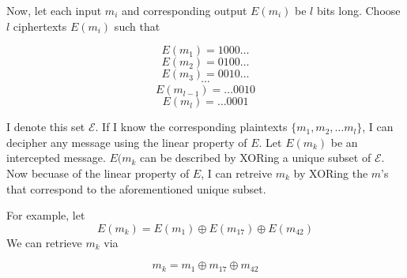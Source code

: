 \documentclass[a4paper,10pt]{article}
\begin{document}
Now, let each input $m_{i}$ and corresponding output $E(m_{i})$ be $l$ bits long.  Choose $l$ ciphertexts $E(m_{i})$ such that

$$E(m_{1}) = 1000\dots$$
$$E(m_{2}) = 0100\dots$$
$$E(m_{3}) = 0010\dots$$
$$\cdots{}$$
$$E(m_{l-1}) = \dots0010$$
$$E(m_{l}) = \dots0001$$

I denote this set $\mathscr{E}$. If I know the corresponding plaintexts $\{m_{1}, m_{2}, \dots m_{l}  \}$, I can decipher any message using the linear property of $E$. Let $E(m_{k})$ be an intercepted message. $E(m_{k}$ can be described by XORing a unique subset of  $\mathscr{E}$.  Now becuase of the linear property of $E$, I can retreive $m_{k}$ by XORing the $m$'s that correspond to the aforementioned unique subset.  

For example, let $$E(m_{k}) = E(m_{1}) \oplus E(m_{17}) \oplus E(m_{42}) $$ 
We can retrieve $m_{k}$ via

$$m_{k} = m_{1} \oplus m_{17} \oplus m_{42} $$
\end{document}
